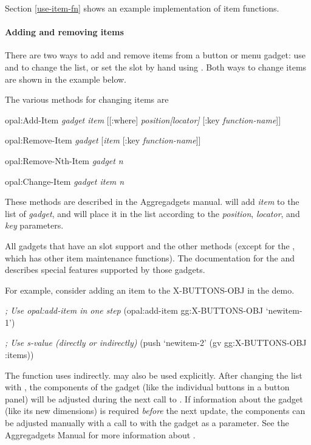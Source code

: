 Section \ref{use-item-fn} shows an example implementation of item
functions.


\paragraph{Adding and removing items}
There are two ways to add and remove items from a button or menu gadget:
use  and  to change the  list,
or set the  slot by hand using .
Both ways to change items are shown in the example below.

The various methods for changing items are

\begin{programexample}
opal:Add-Item {\it gadget item} [[:where] {\it position[locator]} [:key {\it function-name}]]\value{method}

opal:Remove-Item {\it gadget} [{\it item} [:key {\it function-name}]]\value{method}

opal:Remove-Nth-Item {\it gadget} {\it n}\value{method}

opal:Change-Item {\it gadget item n}\value{method}
\end{programexample}

These methods are described in the Aggregadgets manual.
 will add {\it item} to the  list of {\it gadget}, and
will place it in the list according to the {\it position}, {\it locator}, and
{\it key} parameters.

All gadgets that have an  slot support  and the other
methods (except for the , which has other
item maintenance functions).  The documentation for the  and
 describes special features supported by those gadgets.

For example, consider adding an item to the X-BUTTONS-OBJ in the
 demo.
\begin{programexample}
{\it ; Use opal:add-item in one step}
(opal:add-item gg:X-BUTTONS-OBJ `newitem-1')

{\it ; Use s-value (directly or indirectly)}
(push `newitem-2' (gv gg:X-BUTTONS-OBJ :items))
\end{programexample}

The  function uses  indirectly.
 may also be used explicitly.  After changing the  list
with , the components of the gadget
(like the individual buttons in a button panel) will be adjusted during the
next call to .  If information about the gadget (like its new
dimensions) is required {\it before} the next update, the components can be
adjusted manually with a call to  with the
gadget as a parameter.  See the Aggregadgets Manual for more information about
.

